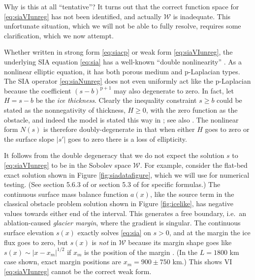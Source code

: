\documentclass[letterpaper,final,12pt,reqno]{amsart}
\theoremstyle{claim}
\newcommand{\pp}{{\text{p}}}
\numberwithin{equation}{section}
\numberwithin{figure}{section}
\numberwithin{table}{section}
\numberwithin{theorem}{section}
\begin{document}
Why is this at all ``tentative''?  It turns out that the correct function space for \eqref{eq:siaVIunreg} has not been identified, and actually $\mathcal{W}$ is inadequate.  This unfortunate situation, which we will not be able to fully resolve, requires some clarification, which we now attempt.

Whether written in strong form \eqref{eq:siacp} or weak form \eqref{eq:siaVIunreg}, the underlying SIA equation \eqref{eq:sia} has a well-known ``double nonlinearity'' \cite{Calvoetal2002}.  As a nonlinear elliptic equation, it has both porous medium \cite{Evans2010} and $\pp$-Laplacian types. The SIA operator \eqref{eq:siaNunreg} does not even uniformly act like the $\pp$-Laplacian because the coefficient $(s-b)^{\pp+1}$ may also degenerate to zero.  In fact, let $H=s-b$ be the \emph{ice thickness}.  Clearly the inequality constraint $s\ge b$ could be stated as the nonnegativity of thickness, $H\ge 0$, with the zero function as the obstacle, and indeed the model is stated this way in \cite{Bueler2016,JouvetBueler2012, Jouvetetal2013,JouvetGraeser2013}; see also \cite{Bueler2020}.  The nonlinear form $N(s)$ is therefore doubly-degenerate in that when either $H$ goes to zero or the surface slope $|s'|$ goes to zero there is a loss of ellipticity.

It follows from the double degeneracy that we do not expect the solution $s$ to \eqref{eq:siaVIunreg} to be in the Sobolev space $\mathcal{W}$.  For example, consider the flat-bed exact solution shown in Figure \ref{fig:siadatafigure}, which we will use for numerical testing.  (See section 5.6.3 of \cite{GreveBlatter2009} or section 5.3 of \cite{vanderVeen2013} for specific formulas.)  The continuous surface mass balance function $a(x)$, like the source term in the classical obstacle problem solution shown in Figure \ref{fig:icelike}, has negative values towards either end of the interval.  This generates a free boundary, i.e.~an ablation-caused \emph{glacier margin}, where the gradient is singular.  The continuous surface elevation $s(x)$ exactly solves \eqref{eq:sia} on $s>0$, and at the margin the ice flux goes to zero, but $s(x)$ is \emph{not} in $\mathcal{W}$ because its margin shape goes like $s(x) \sim |x-x_m|^{1/2}$ if $x_m$ is the position of the margin \cite{Bueleretal2005}.  (In the $L=1800$ km case shown, exact margin positions are $x_m=900\pm 750$ km.)  This shows VI \eqref{eq:siaVIunreg} cannot be the correct weak form.
\end{document}
